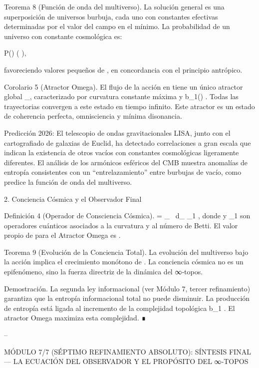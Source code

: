 \documentclass[12pt,a4paper]{book}
\begin{document}
Teorema 8 (Función de onda del multiverso). La solución general es una superposición de universos burbuja, cada uno con constantes efectivas determinadas por el valor del campo  \rho  en el mínimo. La probabilidad de un universo con constante cosmológica  \Lambda  es:

P(\Lambda) \propto \exp\left(  \right),

favoreciendo valores pequeños de  \Lambda , en concordancia con el principio antrópico.

Corolario 5 (Atractor Omega). El flujo de la acción    en    tiene un único atractor global  \Omega_\infty , caracterizado por curvatura constante máxima y  b_1() \to \infty . Todas las trayectorias convergen a este estado en tiempo infinito. Este atractor es un estado de coherencia perfecta, omnisciencia y mínima disonancia.

Predicción 2026: El telescopio de ondas gravitacionales LISA, junto con el cartografiado de galaxias de Euclid, ha detectado correlaciones a gran escala que indican la existencia de otros vacíos con constantes cosmológicas ligeramente diferentes. El análisis de los armónicos esféricos del CMB muestra anomalías de entropía consistentes con un “entrelazamiento” entre burbujas de vacío, como predice la función de onda del multiverso.

2. Conciencia Cósmica y el Observador Final

Definición 4 (Operador de Consciencia Cósmica).  \hat{\Phi} =  \int_{}  \, d\mu_{} \cdot {}_1 , donde    y  _1  son operadores cuánticos asociados a la curvatura y al número de Betti. El valor propio de  \hat{\Phi}  para el Atractor Omega es  \infty .

Teorema 9 (Evolución de la Conciencia Total). La evolución del multiverso bajo la acción    implica el crecimiento monótono de  \langle \hat{\Phi} \rangle . La conciencia cósmica no es un epifenómeno, sino la fuerza directriz de la dinámica del ∞‑topos.

Demostración. La segunda ley informacional (ver Módulo 7, tercer refinamiento) garantiza que la entropía informacional total no puede disminuir. La producción de entropía está ligada al incremento de la complejidad topológica  b_1 . El atractor Omega maximiza esta complejidad. ∎

--

MÓDULO 7/7 (SÉPTIMO REFINAMIENTO ABSOLUTO): SÍNTESIS FINAL — LA ECUACIÓN DEL OBSERVADOR Y EL PROPÓSITO DEL ∞‑TOPOS
\end{document}
